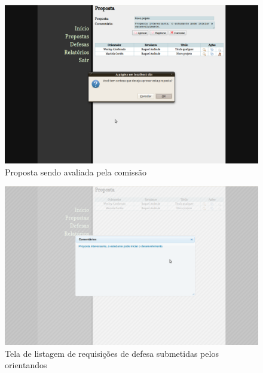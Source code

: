 \begin{figure}[htbp]
\centering
\includegraphics[width=1\textwidth]{fig/telas/processo/comissao_02_proposta_sendo_avaliada.png}
\caption{Proposta sendo avaliada pela comissão}
\label{fig:comissao_02_proposta_sendo_avaliada}
\end{figure}


\begin{figure}[htbp]
\centering
\includegraphics[width=1\textwidth]{fig/telas/processo/comissao_04_comentarios.png}
\caption{Tela de listagem de requisições de defesa submetidas pelos orientandos}
\label{fig:comissao_04_comentarios}
\end{figure}

